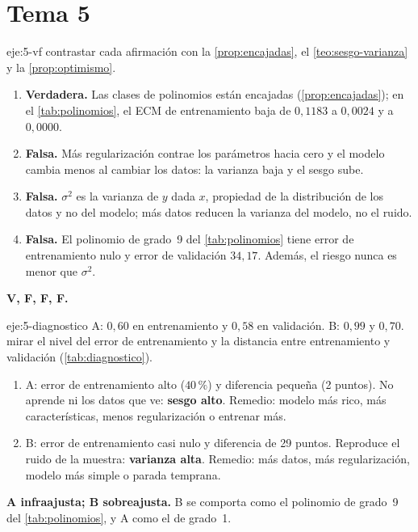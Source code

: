 \section{Tema 5}

\begin{solucion}{eje:5-vf}
\planteamiento contrastar cada afirmación con la \cref{prop:encajadas}, el \cref{teo:sesgo-varianza} y la \cref{prop:optimismo}.
\pasos
\begin{enumerate}[label=(\alph*)]
  \item \textbf{Verdadera.} Las clases de polinomios están encajadas (\cref{prop:encajadas}); en el \cref{tab:polinomios}, el ECM de entrenamiento baja de $0{,}1183$ a $0{,}0024$ y a $0{,}0000$.
  \item \textbf{Falsa.} Más regularización contrae los parámetros hacia cero y el modelo cambia menos al cambiar los datos: la varianza baja y el sesgo sube.
  \item \textbf{Falsa.} $\sigma^{2}$ es la varianza de $y$ dada $x$, propiedad de la distribución de los datos y no del modelo; más datos reducen la varianza del modelo, no el ruido.
  \item \textbf{Falsa.} El polinomio de grado~9 del \cref{tab:polinomios} tiene error de entrenamiento nulo y error de validación $34{,}17$. Además, el riesgo nunca es menor que $\sigma^{2}$.
\end{enumerate}
\resultado \textbf{V, F, F, F.}
\end{solucion}

\begin{solucion}{eje:5-diagnostico}
\datos A: $0{,}60$ en entrenamiento y $0{,}58$ en validación. B: $0{,}99$ y $0{,}70$.
\planteamiento mirar el nivel del error de entrenamiento y la distancia entre entrenamiento y validación (\cref{tab:diagnostico}).
\pasos
\begin{enumerate}[label=\arabic*.]
  \item A: error de entrenamiento alto ($40\,\%$) y diferencia pequeña (2 puntos). No aprende ni los datos que ve: \textbf{sesgo alto}. Remedio: modelo más rico, más características, menos regularización o entrenar más.
  \item B: error de entrenamiento casi nulo y diferencia de 29 puntos. Reproduce el ruido de la muestra: \textbf{varianza alta}. Remedio: más datos, más regularización, modelo más simple o parada temprana.
\end{enumerate}
\resultado \textbf{A infraajusta; B sobreajusta.}
\comprobacion B se comporta como el polinomio de grado~9 del \cref{tab:polinomios}, y A como el de grado~1.
\end{solucion}

